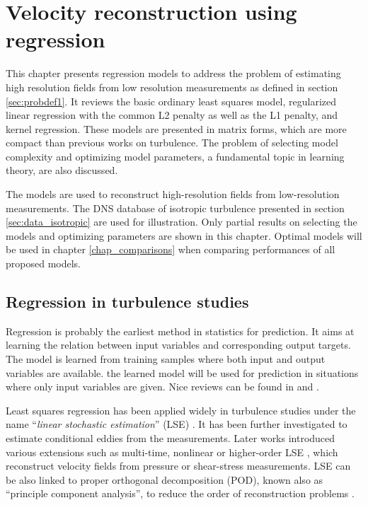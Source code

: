 \chapter{Velocity reconstruction using regression} 
\label{chap_linearregression} 

This chapter presents regression models to address the problem of estimating high resolution fields from low resolution measurements as defined in section \ref{sec:probdef1}. It reviews the basic ordinary least squares model, regularized linear regression with the common L2 penalty as well as the L1 penalty, and kernel regression. These models are presented in matrix forms, which are more compact than previous works on turbulence. The problem of selecting model complexity and optimizing model parameters, a fundamental topic in learning theory, are also discussed. 

The models are used to reconstruct high-resolution fields from low-resolution measurements. The DNS database of isotropic turbulence presented in section \ref{sec:data_isotropic} are used for illustration. Only partial results on selecting the models and optimizing parameters are shown in this chapter. Optimal models will be used in chapter \ref{chap_comparisons} when comparing performances of all proposed models. 

\section{Regression in turbulence studies}
Regression is probably the earliest method in statistics for prediction. It aims at learning the relation between input variables and corresponding output targets. The model is learned from training samples where both input and output variables are available. the learned model will be used for prediction in situations where only input variables are given. Nice reviews can be found in \citet{bishop2006pattern} and \citet{hastie2009elements}. 

Least squares regression has been applied widely in turbulence studies under the name ``\textit{linear stochastic estimation}'' (LSE) \citep{adrian1977role,adrian1979conditional}. It has been further investigated \citep{guezennec1989stochastic,adrian1992stochastic,ewing1999examination} to estimate conditional eddies from the measurements. Later works introduced various extensions such as multi-time, nonlinear or higher-order LSE \citep{mokhasi2009predictive,durgesh2010multi,nguyen2010proper,meyer2014provide}, which reconstruct velocity fields from pressure or shear-stress measurements. LSE can be also linked to proper orthogonal decomposition (POD), known also as ``principle component analysis'', to reduce the order of reconstruction problems \citep{bonnet1994stochastic}. 


